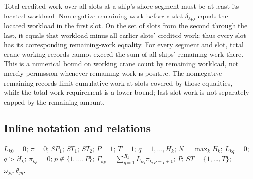 \documentclass[10pt]{article}
\begin{document}
Total credited work over all slots at a ship's shore segment must be at least its located workload. Nonnegative remaining work before a slot $\delta_{kpj}$ equals the located workload in the first slot. On the set of slots from the second through the last, it equals that workload minus all earlier slots' credited work; thus every slot has its corresponding remaining-work equality. For every segment and slot, total crane working records cannot exceed the sum of all ships' remaining work there. This is a numerical bound on working crane count by remaining workload, not merely permission whenever remaining work is positive. The nonnegative remaining records limit cumulative work at slots covered by those equalities, while the total-work requirement is a lower bound; last-slot work is not separately capped by the remaining amount.

\subsection*{Inline notation and relations}
$L_{k0}=0$; $\pi=0$; $SP_1$; $ST_1$; $ST_2$; $P=1$; $T=1$; $q=1,\ldots,H_k$; $N=\max_kH_k$; $L_{kq}=0$; $q>H_k$; $\pi_{kp}=0$; $p\notin\{1,\ldots,P\}$; $\Gamma_{kp}=\sum_{q=1}^{H_k}L_{kq}\pi_{k,p-q+1}$; $P$; $ST=\{1,\ldots,T\}$; $\omega_{jg},\theta_{jg}$.
\end{document}
